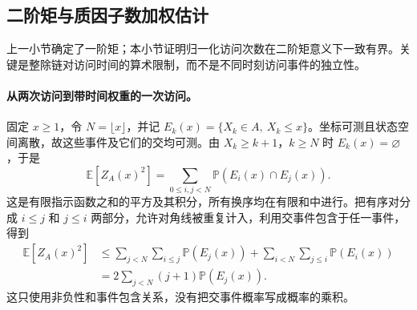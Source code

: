 \subsection{二阶矩与质因子数加权估计}
上一小节确定了一阶矩；本小节证明归一化访问次数在二阶矩意义下一致有界。关键是整除链对访问时间的算术限制，而不是不同时刻访问事件的独立性。

\paragraph{从两次访问到带时间权重的一次访问。}
固定 $x\ge1$，令 $N=\lfloor x\rfloor$，并记
$E_k(x)=\{X_k\in A,\ X_k\le x\}$。坐标可测且状态空间离散，故这些事件及它们的交均可测。由 $X_k\ge k+1$，$k\ge N$ 时 $E_k(x)=\varnothing$，于是
\[
 \mathbb E[Z_A(x)^2]
 =\sum_{0\le i,j<N}\mathbb P(E_i(x)\cap E_j(x)).
\]
这是有限指示函数之和的平方及其积分，所有换序均在有限和中进行。把有序对分成 $i\le j$ 和 $j\le i$ 两部分，允许对角线被重复计入，利用交事件包含于任一事件，得到
\begin{equation}\label{eq:pair-index-bound}
 \begin{split}
 \mathbb E[Z_A(x)^2]
 &\le\sum_{j<N}\sum_{i\le j}\mathbb P(E_j(x))
    +\sum_{i<N}\sum_{j\le i}\mathbb P(E_i(x))\\
 &=2\sum_{j<N}(j+1)\mathbb P(E_j(x)).
 \end{split}
\end{equation}
这只使用非负性和事件包含关系，没有把交事件概率写成概率的乘积。


